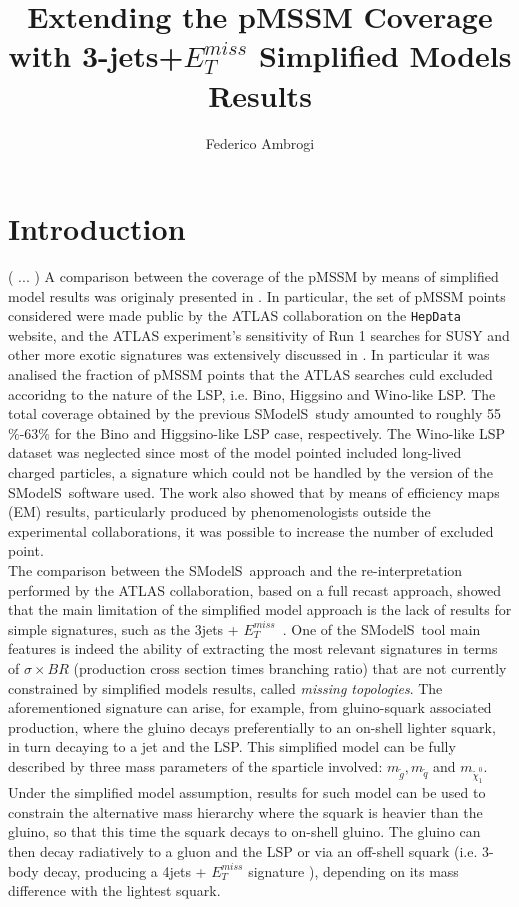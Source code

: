 \documentclass[a4paper,11pt]{article}
\title{\boldmath Extending the pMSSM Coverage with 3-jets+$E_T ^{miss}$ Simplified Models Results}
\author[a]{Federico Ambrogi}
\affiliation[a]{University of Vienna, Faculty of Physics, Bolzmanngasse 5, A-1090 Wien, Austria}
\newcommand{\SMO}{{\sc SModelS}}
\newcommand{\MET}{{ $E_T ^{miss}$}}
\begin{document}
 
\sffamily
\maketitle
\flushbottom

\section{Introduction}
( ... )
A comparison between the coverage of the pMSSM by means of simplified model results was originaly presented in \cite{Ambrogi:2017lov}. In particular, the set of pMSSM points considered were made public by the ATLAS collaboration on the \texttt{HepData} website\cite{ATLASpMSSMhepdata}, and the ATLAS experiment's sensitivity of Run 1 searches for SUSY and other more exotic signatures was extensively discussed in \cite{2015baa}. In particular it was analised the fraction of pMSSM points that the ATLAS searches culd excluded accoridng to the nature of the LSP, i.e. Bino, Higgsino and Wino-like LSP. 
The total coverage obtained by the previous \SMO~study amounted to roughly 55$\%$-63$\%$ for the Bino and Higgsino-like LSP case, respectively. The Wino-like LSP dataset was neglected since most of the model pointed included long-lived charged particles, a signature which could not be handled by the version of the \SMO~software used. The work also showed that by means of efficiency maps (EM) results, particularly produced by phenomenologists outside the experimental collaborations, it was possible to increase the number of excluded point.
\\


The comparison between the \SMO~approach and the re-interpretation performed by the ATLAS collaboration, based on a full recast approach, showed that the main limitation of the simplified model approach is the lack of results for simple signatures, such as the 3jets +\MET~. One of the \SMO~tool main features is indeed the ability of extracting the most relevant signatures in terms of $\sigma \times BR$ (production cross section  times branching ratio) that are not currently constrained by simplified models results, called \textit{missing topologies}. The aforementioned signature can arise, for example, from gluino-squark associated production, where the gluino decays preferentially to an on-shell lighter squark, in turn decaying to a jet and the LSP. This simplified model can be fully described by three mass parameters of the sparticle involved: $m_{\tilde g}, m_{\tilde q}$ and $m_{\tilde \chi _1 ^0}$. Under the simplified model assumption, results for such model can be used to constrain the alternative mass hierarchy where the squark is heavier than the gluino, so that this time the squark decays to on-shell gluino. The gluino can then decay radiatively to a gluon and the LSP or via an off-shell squark (i.e. 3-body decay, producing a 4jets + $E_T ^{miss}$ signature ), depending on its mass difference with the lightest squark. 
\\
\end{document}
